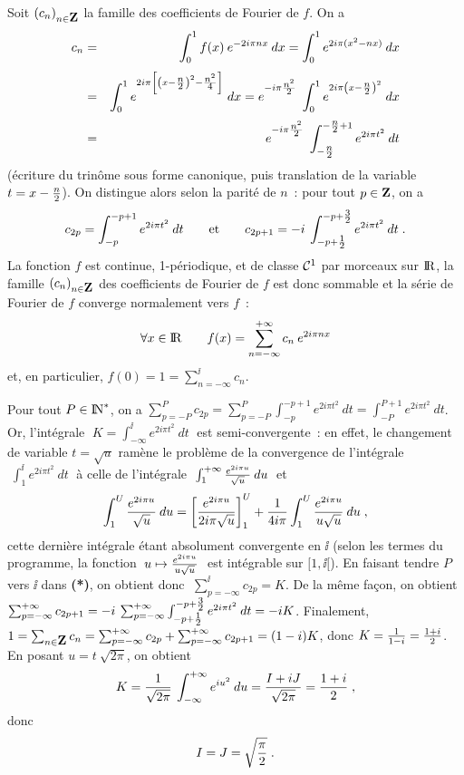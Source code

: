 \documentclass{article}
\begin{document}
Soit $(c_n)_{n\in\zmat}$ la famille des coefficients de Fourier de $f$. On a\vv
\begin{eqnarray*}
c_n & = & \int_0^1f(x)\>e^{-2i\pi n x}\>dx=\int_0^1e^{2i\pi(x^2-nx)}\>dx\\ \nssk
               & = & \int_0^1e^{{}^{\sst2i\pi\lc\lp x-{\sst n\sur\sst2}\rp^2-
                                 {\sst n^2\sur\sst 4}\rc}}\>dx
                 = e^{{}^{\sst-i\pi{\sst n^2\sur\sst2}}}\>\int_0^1e^{{}^{\sst
                                 2i\pi\lp x-{\sst n\sur\sst2}\rp^2}}\>dx\\ \nssk
               & = & e^{{}^{\sst-i\pi{\sst n^2\sur\sst2}}}\>\int_{-{\sst n\sur\sst2}}^{-{\sst n\sur\sst2}+1}
                                 e^{2i\pi t^2}\>dt
\end{eqnarray*}
(\'ecriture du trin\^ome sous forme canonique, puis translation de la variable
$t=x-{n\over2}$). On distingue alors selon la parit\'e de $n$~: pour tout $p\in\zmat$,
on a\vv
$$c_{2p}=\int_{-p}^{-p+1}e^{2i\pi t^2}\>dt\qquad{\rm et}\qquad
  c_{2p+1}=-i\>\int_{-p+{\sst1\sur\sst2}}^{-p+{\sst3\sur\sst2}}e^{2i\pi t^2}\>dt\;.$$
La fonction $f$ est continue, 1-p\'eriodique, et de classe ${\cal C}^1$ par morceaux sur ${\rm I\kern-0.6mm R}$,
la famille $(c_n)_{n\in\zmat}$ des coefficients de Fourier de $f$ est donc sommable
et la s\'erie de Fourier de $f$ converge normalement vers $f$~:
$$\forall x\in{\rm I\kern-0.6mm R}\qquad f(x)=\sum_{n=-\infty}^{+\infty}c_n\>e^{2i\pi nx}$$
et, en particulier, $f(0)=1=\sum_{n=-\infty}^{\ii}c_n$.
\msk

Pour tout $P\in{\rm I\kern-0.5mm N}^*$, on a $\sum_{p=-P}^{P}c_{2p}=\sum_{p=-P}^{P}\int_{-p}^{-p+1}e^{2i\pi t^2}\>dt=
\int_{-P}^{P+1}e^{2i\pi t^2}\>dt$.\qquad{\bf (*)}
\ssk
Or, l'int\'egrale $\;K=\int_{-\infty}^{\ii}e^{2i\pi t^2}\>dt\;$ est semi-convergente~: en effet, le changement de variable
$t=\sqrt{u}$ ram\`ene le probl\`eme de la convergence de l'int\'egrale $\;\int_1^{\ii}
e^{2i\pi t^2}\>dt\;$ \`a celle de l'int\'egrale $\;\int_1^{+\infty}{e^{2i\pi u}\over\sqrt{u}}\>du\;$
et
$$\int_1^U{e^{2i\pi u}\over\sqrt{u}}\>du=\left[{e^{2i\pi u}\over2i\pi\sqrt{u}}\right]_1^U
  +{1\over4i\pi}\int_1^U{e^{2i\pi u}\over u\sqrt{u}}\>du\;,$$
cette derni\`ere int\'egrale \'etant absolument convergente en $\ii$ (selon les
termes du programme, la fonction $\;u\mapsto{e^{2i\pi u}\over u\sqrt{u}}\;$
est int\'egrable sur $[1,\ii[$).\ssk
En faisant tendre $P$ vers $\ii$ dans {\bf (*)}, on obtient donc $\;
\sum_{p=-\infty}^{\ii}c_{2p}=K$.\ssk
De la m\^eme fa\c con, on obtient $\sum_{p=-\infty}^{\ii}c_{2p+1}=-i\>\sum_{p=-\infty}^{\ii}
\int_{-p+{\sst1\sur\sst2}}^{-p+{\sst3\sur\sst2}}e^{2i\pi t^2}\>dt=-iK$.\ssk
Finalement, $1=\sum_{n\in\zmat}c_n=\sum_{p=-\infty}^{\ii}c_{2p}+\sum_{p=-\infty}
^{\ii}c_{2p+1}=(1-i)K$, donc $K={1\over 1-i}={1+i\over2}$. En posant $u=t\>\sqrt{2\pi}$,
on obtient\vv
$$K={1\over\sqrt{2\pi}}\>\int_{-\infty}^{+\infty}e^{iu^2}\>du={I+iJ\over\sqrt{2\pi}}={1+i\over2}\;,$$
donc\vv
$$I=J=\sqrt{\pi\over2}\;.$$
\end{document}
